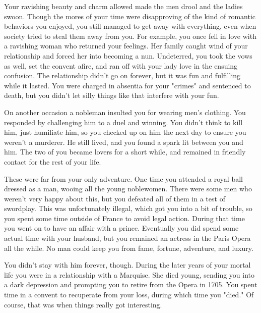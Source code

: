\documentclass[char]{guildcamp4}
\begin{document}
Your ravishing beauty and charm allowed made the men drool and the ladies swoon. Though the mores of your time were disapproving of the kind of romantic behaviors you enjoyed, you still managed to get away with everything, even when society tried to steal them away from you. For example, you once fell in love with a ravishing woman who returned your feelings. Her family caught wind of your relationship and forced her into becoming a nun. Undeterred, you took the vows as well, set the convent afire, and ran off with your lady love in the ensuing confusion. The relationship didn't go on forever, but it was fun and fulfilling while it lasted. You were charged in absentia for your "crimes" and sentenced to death, but you didn't let silly things like that interfere with your fun.

On another occasion a nobleman insulted you for wearing men's clothing. You responded by challenging him to a duel and winning. You didn't think to kill him, just humiliate him, so you checked up on him the next day to ensure you weren't a murderer. He still lived, and you found a spark lit between you and him. The two of you became lovers for a short while, and remained in friendly contact for the rest of your life.

These were far from your only adventure. One time you attended a royal ball dressed as a man, wooing all the young noblewomen. There were some men who weren't very happy about this, but you defeated all of them in a test of swordplay. This was unfortunately illegal, which got you into a bit of trouble, so you spent some time outside of France to avoid legal action. During that time you went on to have an affair with a prince. Eventually you did spend some actual time with your husband, but you remained an actress in the Paris Opera all the while. No man could keep you from fame, fortune, adventure, and luxury.

You didn't stay with him forever, though. During the later years of your mortal life you were in a relationship with a Marquise. She died young, sending you into a dark depression and prompting you to retire from the Opera in 1705. You spent time in a convent to recuperate from your loss, during which time you "died." Of course, that was when things really got interesting.
\end{document}
